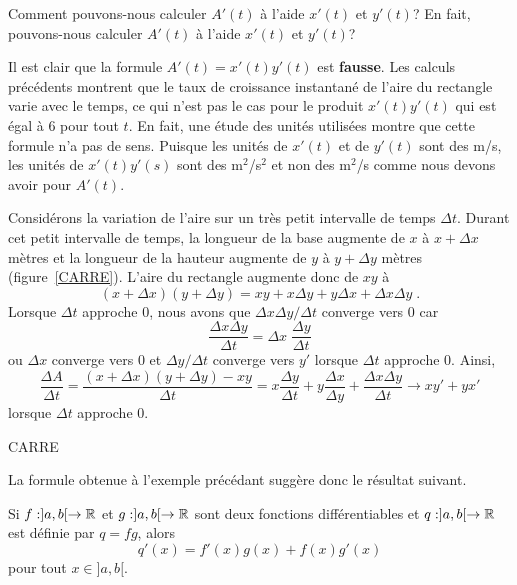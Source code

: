 {\begin{egg}
Comment pouvons-nous calculer $A'(t)$ à l'aide $x'(t)$ et $y'(t)$?  En
fait, pouvons-nous calculer $A'(t)$ à l'aide $x'(t)$ et $y'(t)$?

Il est clair que la formule $A'(t) = x'(t) y'(t)$ est
{\bfseries fausse}.  Les calculs précédents montrent que le taux de
croissance instantané de l'aire du rectangle varie avec le temps, ce
qui n'est pas le cas pour le produit $x'(t)y'(t)$ qui est égal à $6$
pour tout $t$.  En fait, une étude des unités utilisées montre que
cette formule n'a pas de sens.  Puisque les unités de $x'(t)$ et de
$y'(t)$ sont des m/s, les unités de $x'(t) y'(s)$ sont des m$^2$/s$^2$
et non des m$^2$/s comme nous devons avoir pour $A'(t)$.

Considérons la variation de l'aire sur un très petit intervalle de
temps $\Delta t$.  Durant cet petit intervalle de temps, la longueur
de la base augmente de $x$ à $x+\Delta x$ mètres et la longueur de la
hauteur augmente de $y$ à $y+\Delta y$ mètres (figure~\ref{CARRE}).
L'aire du rectangle augmente donc de $xy$ à
\[
(x+ \Delta x)(y + \Delta y) = x y+ x \Delta y +y \Delta x + \Delta x
\Delta y \; .
\]
Lorsque $\Delta t$ approche $0$, nous avons que
$\Delta x \Delta y / \Delta t$ converge vers $0$ car
\[
\frac{\Delta x \Delta y}{\Delta t} =
\Delta x \; \frac{\Delta y}{\Delta t}
\]
ou $\Delta x$ converge vers $0$ et $\Delta y/\Delta t$
converge vers $y'$ lorsque $\Delta t$ approche $0$.  Ainsi,
\[
\frac{\Delta A}{\Delta t} =
\frac{(x+ \Delta x)(y + \Delta y)-xy}{\Delta t}
= x \frac{\Delta y}{\Delta t} + y \frac{\Delta x}{\Delta y} 
+ \frac{\Delta x \Delta y}{\Delta t} \to x y' + y x'
\]
lorsque $\Delta t$ approche $0$.
\end{egg}

{CARRE}

La formule obtenue à l'exemple précédant suggère donc le résultat suivant.

\begin{theorem}
Si $f:]a,b[\rightarrow \mathbb{R}$ et $g:]a,b[\rightarrow \mathbb{R}$ sont deux
fonctions différentiables et $q:]a,b[\rightarrow \mathbb{R}$ est définie par
$q = fg$, alors
\[
q'(x) = f'(x) g(x) + f(x) g'(x)
\]
pour tout $x\in ]a,b[$.
\end{theorem}

}
